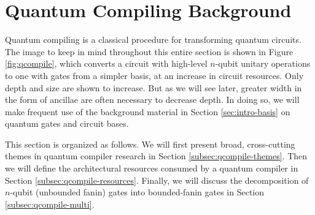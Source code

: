 \section{Quantum Compiling Background}
\label{sec:qcompile-bg}

Quantum compiling is a classical procedure for transforming quantum circuits.
The image to keep in mind throughout this entire section is shown in
Figure \ref{fig:qcompile}, which converts a circuit with high-level
$n$-qubit unitary operations to one with gates from a simpler basis,
at an increase in circuit resources.
 Only depth and size are shown to
increase. But as we will see later, greater width in the form of
ancillae are often necessary to
decrease depth. In doing so, we will make frequent use of the background
material in Section \ref{sec:intro-basis} on quantum gates and
circuit bases.

This section is organized as follows.
We will first present broad, cross-cutting themes in
quantum compiler research in Section \ref{subsec:qcompile-themes}.
Then we will define the architectural resources consumed by
a quantum compiler in Section \ref{subsec:qcompile-resources}.
Finally, we will discuss the decomposition of $n$-qubit
(unbounded fanin) gates
into bounded-fanin gates in Section \ref{subsec:qcompile-multi}.

